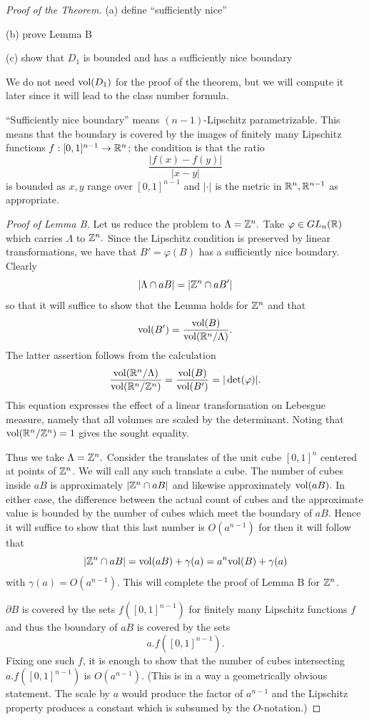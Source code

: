 \documentclass[10pt,a4paper,reqno]{amsart}
\begin{document}
\begin{proof}[Proof of the Theorem]
(a) define ``sufficiently nice''

(b) prove Lemma B

(c) show that $D_1$ is bounded and has a sufficiently nice boundary

We do not need $\mathrm{vol}(D_1)$ for the proof of the theorem, but we will compute it
later since it will lead to the class number formula.

\bigskip

``Sufficiently nice boundary'' means $(n-1)$-Lipschitz parametrizable. This
means that the boundary is covered by the images of finitely many Lipschitz
functions $f : [0,1]^{n-1} \rightarrow \mathbb{R}^n$; the condition is that the ratio
\[\frac{|f(x)-f(y)|}{|x-y|}\] is bounded as $x,y$ range over $[0,1]^{n-1}$ and
$|\cdot|$ is the metric in $\mathbb{R}^n,\mathbb{R}^{n-1}$ as appropriate.

\emph{Proof of Lemma B.} Let us reduce the problem to $\Lambda = \mathbb{Z}^n.$ Take
$\varphi\in GL_n(\mathbb{R})$ which carries $\Lambda$ to $\mathbb{Z}^n.$ Since the Lipschitz
condition is preserved by linear transformations, we have that $B' =
\varphi(B)$ has a sufficiently nice boundary. Clearly \[|\Lambda\cap aB| = |
\mathbb{Z}^n\cap aB'|\] so that it will suffice to show that the Lemma holds for $\mathbb{Z}^n$
and that \[\mathrm{vol}(B') = \frac{\mathrm{vol}(B)}{\mathrm{vol}(\mathbb{R}^n/\Lambda)}.\] The latter
assertion follows from the calculation
\[\frac{\mathrm{vol}(\mathbb{R}^n/\Lambda)}{\mathrm{vol}(\mathbb{R}^n/\mathbb{Z}^n)} = \frac{\mathrm{vol}(B)}{\mathrm{vol}(B')} =
|\det(\varphi)|.\] This equation expresses the effect of a linear
transformation on Lebesgue measure, namely that all volumes are scaled by the
determinant. Noting that $\mathrm{vol}(\mathbb{R}^n/\mathbb{Z}^n) = 1$ gives the sought equality.

Thus we take $\Lambda = \mathbb{Z}^n.$ Consider the translates of the unit cube
$[0,1]^n$ centered at points of $\mathbb{Z}^n$. We will call any such translate a cube.
The number of cubes inside $aB$ is approximately $|\mathbb{Z}^n\cap aB|$ and likewise
approximately $\mathrm{vol}(aB).$ In either case, the difference between the actual
count of cubes and the approximate value is bounded by the number of cubes
which meet the boundary of $aB.$ Hence it will suffice to show that this last
number is $O(a^{n-1})$ for then it will follow that \[|\mathbb{Z}^n \cap aB | =
\mathrm{vol}(aB) + \gamma(a) = a^n\mathrm{vol}(B) + \gamma(a)\] with $\gamma(a) = O(a^{n-1})$.
This will complete the proof of Lemma B for $\mathbb{Z}^n$.

$\partial B$ is covered by the sets $f([0,1]^{n-1})$ for finitely many
Lipschitz functions $f$ and thus the boundary of $aB$ is covered by the sets
\[a.f([0,1]^{n-1}).\] Fixing one such $f$, it is enough to show that the number
of cubes intersecting $a.f([0,1]^{n-1})$ is $O(a^{n-1})$. (This is in a way a
geometrically obvious statement. The scale by $a$ would produce the factor of
$a^{n-1}$ and the Lipschitz property produces a constant which is subsumed by
the $O$-notation.)


\end{proof}
\end{document}
